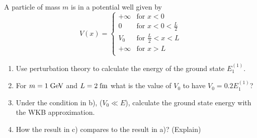 \begin{esercizio}
   A particle of mass $m$ is in a potential well given by
   \begin{equation*}
      V(x)=
      \begin{cases}
         +\infty & \text{for } x<0\\
         0 & \text{for } x<0<\frac{L}{2}\\
         V_0 & \text{for } \frac{L}{2}<x<L\\
         +\infty & \text{for } x>L\\
      \end{cases}
   \end{equation*}
   \begin{enumerate}[label=\alph*), leftmargin=0.6cm]
      \item Use perturbation theory to calculate the energy of the ground state $E_1^{(1)}$.
      \item For $m=1 \; \rm GeV$ and $L=2 \; \rm fm$ what is the value of $V_0$ to have $V_0=0.2E_1^{(1)}$?
      \item Under the condition in b), ($V_0 \ll E$), calculate the ground state energy with the WKB approximation.
      \item How the result in c) compares to the result in a)? (Explain)
   \end{enumerate}
\end{esercizio}
